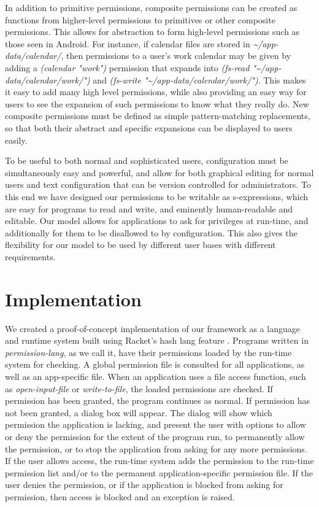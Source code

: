 In addition to primitive permissions, composite permissions can be created as functions from higher-level permissions to primitives or other composite permissions.  This allows for abstraction to form high-level permissions such as those seen in Android.  For instance, if calendar files are stored in \textit{\textasciitilde/app-data/calendar/}, then permissions to a user's work calendar may be given by adding a \textit{(calendar "work")} permission that expands into \textit{(fs-read "\textasciitilde/app-data/calendar/work/")} and \textit{(fs-write "\textasciitilde/app-data/calendar/work/")}.  This makes it easy to add many high level permissions, while also providing an easy way for users to see the expansion of such permissions to know what they really do.  New composite permissions must be defined as simple pattern-matching replacements, so that both their abstract and specific expansions can be displayed to users easily.

To be useful to both normal and sophisticated users, configuration must be simultaneously easy and powerful, and allow for both graphical editing for normal users and text configuration that can be version controlled for administrators.
To this end we have designed our permissions to be writable as s-expressions, which are easy for programs to read and write, and eminently human-readable and editable.
Our model allows for applications to ask for privileges at run-time, and additionally for them to be disallowed to by configuration.  This also gives the flexibility for our model to be used by different user bases with different requirements.

\section{Implementation}\label{section:implementation}
We created a proof-of-concept implementation of our framework as a language and runtime system built using Racket's hash lang feature \cite{rakt}. Programs written in \textit{permission-lang}, as we call it, have their permissions loaded by the run-time system for checking.
A global permission file is consulted for all applications, as well as an app-specific file.  
When an application uses a file access function, such as \textit{open-input-file} or \textit{write-to-file}, the loaded permissions are checked.  
If permission has been granted, the program continues as normal.  
If permission has not been granted, a dialog box will appear.  
The dialog will show which permission the application is lacking, and present the user with options to allow or deny the permission for the extent of the program run, to permanently allow the permission, or to stop the application from asking for any more permissions.
If the user allows access, the run-time system adds the permission to the run-time permission list and/or to the permanent application-specific permission file.
If the user denies the permission, or if the application is blocked from asking for permission, then access is blocked and an exception is raised.

